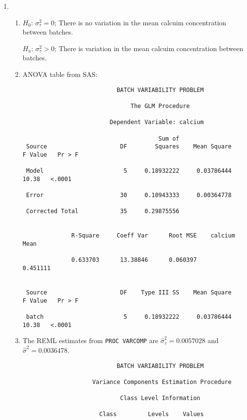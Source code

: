 \documentclass[11pt]{article}
\begin{document}
\begin{enumerate}
\pagebreak
\item %

\begin{enumerate}

\item %
\(H_0\): \(\sigma^2_\tau=0\); There is no variation in the mean calcuim concentration between batches.

\(H_a\): \(\sigma^2_\tau>0\); There is variation in the mean calcuim concentration between batches.

\item %
ANOVA table from SAS:

\begin{verbatim}
                           BATCH VARIABILITY PROBLEM

                               The GLM Procedure
 
                         Dependent Variable: calcium   

                                       Sum of
 Source                     DF        Squares    Mean Square   F Value   Pr > F

 Model                       5     0.18932222     0.03786444     10.38   <.0001

 Error                      30     0.10943333     0.00364778                   

 Corrected Total            35     0.29875556                                  


              R-Square     Coeff Var      Root MSE    calcium Mean

              0.633703      13.38846      0.060397        0.451111


 Source                     DF    Type III SS    Mean Square   F Value   Pr > F

 batch                       5     0.18932222     0.03786444     10.38   <.0001
\end{verbatim}

\pagebreak
\item %
The REML estimates from \verb|PROC VARCOMP| are \(\widehat\sigma^2_\tau=0.0057028\)
and \(\widehat\sigma^2=0.0036478\).

\begin{verbatim}
                           BATCH VARIABILITY PROBLEM

                    Variance Components Estimation Procedure

                            Class Level Information
 
                      Class         Levels    Values


\end{verbatim}
\end{enumerate}
\end{enumerate}
\end{document}
